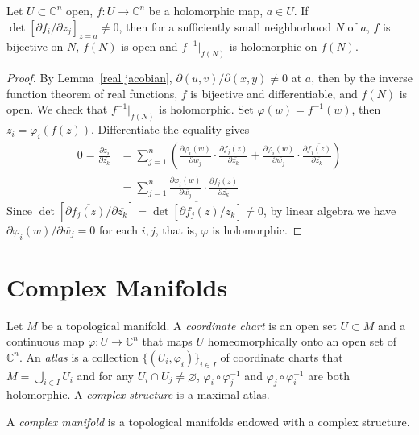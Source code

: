 \begin{thm}
    Let $U\subset\mathbb{C}^n$ open, $f:U\to\mathbb{C}^n$ be a holomorphic map, $a\in U$.
    If $\det[\partial{f_i}/\partial{z_j}]_{z=a}\neq 0$, then for a sufficiently small neighborhood $N$ of $a$, $f$ is bijective on $N$, $f(N)$ is open and $f^{-1}|_{f(N)}$ is holomorphic on $f(N)$.
\end{thm}
\begin{proof}
    By Lemma~\ref{real jacobian}, $\partial(u,v)/\partial(x,y)\neq 0$ at $a$, then by the inverse function theorem of real functions, $f$ is bijective and differentiable, and $f(N)$ is open.
    We check that $f^{-1}|_{f(N)}$ is holomorphic.
    Set $\varphi(w)=f^{-1}(w)$, then $z_i=\varphi_i(f(z))$.
    Differentiate the equality gives
    \begin{align*}
        0=\frac{\partial z_i}{\partial\overline{z_k}}&=\sum_{j=1}^n\left(\frac{\partial\varphi_i(w)}{\partial w_j}\cdot\frac{\partial f_j(z)}{\partial\overline{z_k}}+\frac{\partial\varphi_i(w)}{\partial\overline{w_j}}\cdot\frac{\partial\overline{f_j(z)}}{\partial\overline{z_k}}\right)\\
        &=\sum_{j=1}^n\frac{\partial\varphi_i(w)}{\partial\overline{w_j}}\cdot\frac{\partial\overline{f_j(z)}}{\partial\overline{z_k}}
    \end{align*}
    Since $\det[\partial\overline{f_j(z)}/\partial\overline{z_k}]=\overline{\det[\partial f_j(z)/z_k]}\neq 0$, by linear algebra we have $\partial\varphi_i(w)/\partial\overline{w_j}=0$ for each $i,j$, that is, $\varphi$ is holomorphic.
\end{proof}

\section{Complex Manifolds}

\begin{defn}
    Let $M$ be a topological manifold.
    A \emph{coordinate chart} is an open set $U\subset M$ and a continuous map $\varphi:U\to\mathbb{C}^n$ that maps $U$ homeomorphically onto an open set of $\mathbb{C}^n$.
    An \emph{atlas} is a collection $\{(U_i,\varphi_i)\}_{i\in I}$ of coordinate charts that $M=\bigcup_{i\in I}U_i$ and for any $U_i\cap U_j\neq\varnothing$, $\varphi_i\circ\varphi_j^{-1}$ and $\varphi_j\circ\varphi_i^{-1}$ are both holomorphic.
    A \emph{complex structure} is a maximal atlas.

    A \emph{complex manifold} is a topological manifolds endowed with a complex structure.
\end{defn}

